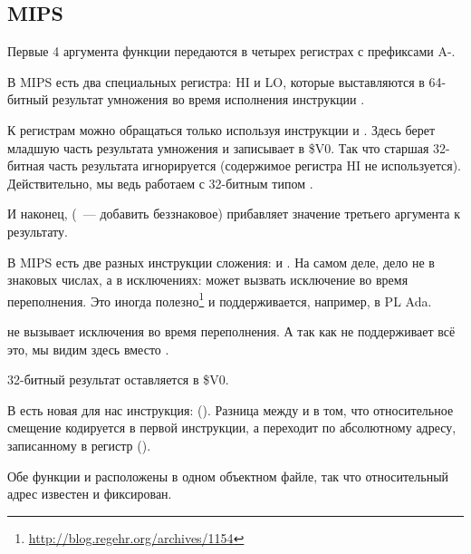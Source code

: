 \subsection{MIPS}



Первые 4 аргумента функции передаются в четырех регистрах с префиксами A-.

В MIPS есть два специальных регистра: HI и LO, которые выставляются в 64-битный результат умножения
во время исполнения инструкции .

К регистрам можно обращаться только используя инструкции  и .
Здесь  берет младшую часть результата умножения и записывает в \$V0.
Так что старшая 32-битная часть результата игнорируется (содержимое регистра HI не используется).
Действительно, мы ведь работаем с 32-битным типом \Tint.


И наконец,  (~--- добавить беззнаковое) прибавляет значение третьего аргумента к результату.

В MIPS есть две разных инструкции сложения:  и .
На самом деле, дело не в знаковых числах, а в исключениях:  может вызвать исключение
во время переполнения. Это иногда полезно\footnote{\url{http://blog.regehr.org/archives/1154}} и поддерживается,
например, в \ac{PL} Ada.

 не вызывает исключения во время переполнения.
А так как \CCpp не поддерживает всё это, мы видим здесь  вместо .

32-битный результат оставляется в \$V0.

В \main есть новая для нас инструкция:  (). 
Разница между  и  в том, что относительное смещение кодируется в первой инструкции,
а  переходит по абсолютному адресу, записанному в регистр ().

Обе функции \ttf и \main расположены в одном объектном файле, так что относительный адрес \ttf известен и фиксирован.

